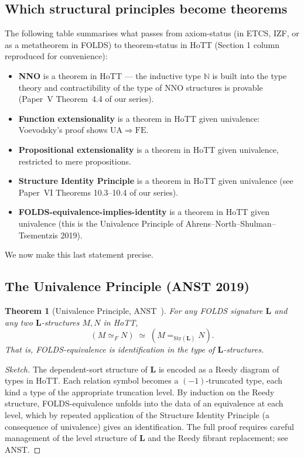 \documentclass[12pt]{article}
\newtheorem{theorem}{Theorem}[section]
\theoremstyle{definition}
\theoremstyle{remark}
\begin{document}
\subsection{Which structural principles become theorems}

The following table summarises what passes from axiom-status (in ETCS, IZF, or as a
metatheorem in FOLDS) to theorem-status in HoTT (Section 1 column reproduced for
convenience):
\begin{itemize}
\item \textbf{NNO} is a theorem in HoTT --- the inductive type $\mathbb{N}$ is built into
the type theory and contractibility of the type of NNO structures is provable
(Paper~V Theorem~4.4 of our series).
\item \textbf{Function extensionality} is a theorem in HoTT given univalence: Voevodsky's
proof shows $\mathrm{UA}\Rightarrow \mathrm{FE}$.
\item \textbf{Propositional extensionality} is a theorem in HoTT given univalence,
restricted to mere propositions.
\item \textbf{Structure Identity Principle} is a theorem in HoTT given univalence
(see Paper~VI Theorems 10.3--10.4 of our series).
\item \textbf{FOLDS-equivalence-implies-identity} is a theorem in HoTT given univalence
(this is the Univalence Principle of Ahrens--North--Shulman--Tsementzis 2019).
\end{itemize}

We now make this last statement precise.

\subsection{The Univalence Principle (ANST 2019)}

\begin{theorem}[Univalence Principle, ANST~\cite{ANST2019}]
\label{thm:up}
For any FOLDS signature $\mathbf{L}$ and any two $\mathbf{L}$-structures $M, N$ in HoTT,
\[
(M\simeq_F N)\;\simeq\;(M=_{\mathrm{Str}(\mathbf{L})} N).
\]
That is, FOLDS-equivalence is identification in the type of $\mathbf{L}$-structures.
\end{theorem}
\begin{proof}[Sketch]
The dependent-sort structure of $\mathbf{L}$ is encoded as a Reedy diagram of types in
HoTT. Each relation symbol becomes a $(-1)$-truncated type, each kind a type of the
appropriate truncation level. By induction on the Reedy structure, FOLDS-equivalence
unfolds into the data of an equivalence at each level, which by repeated application of
the Structure Identity Principle (a consequence of univalence) gives an identification.
The full proof requires careful management of the level structure of $\mathbf{L}$ and the
Reedy fibrant replacement; see ANST.
\end{proof}
\end{document}
